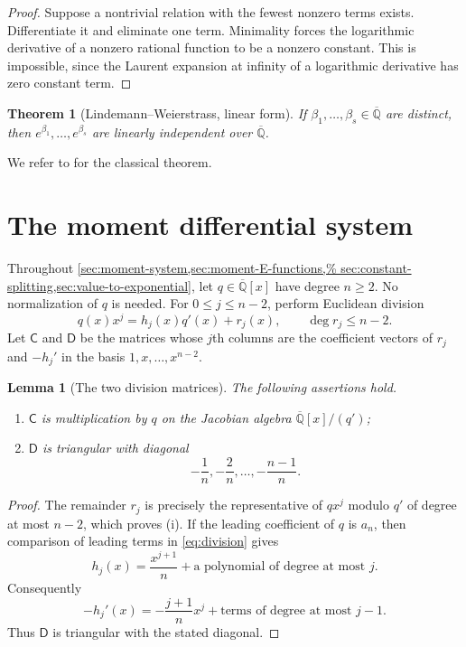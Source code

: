 \documentclass[11pt]{article}
\numberwithin{equation}{section}
\newtheorem{theorem}{Theorem}[section]
\newtheorem{lemma}[lemma]{Lemma}
\theoremstyle{definition}
\theoremstyle{remark}
\newcommand{\Qbar}{\overline{\mathbb Q}}
\begin{document}
\begin{proof}
Suppose a nontrivial relation with the fewest nonzero terms exists.
Differentiate it and eliminate one term.  Minimality forces the logarithmic
derivative of a nonzero rational function to be a nonzero constant.  This is
impossible, since the Laurent expansion at infinity of a logarithmic derivative
has zero constant term.
\end{proof}

\begin{theorem}[Lindemann--Weierstrass, linear form]
\label{thm:Lindemann-Weierstrass}
If $\beta_1,\ldots,\beta_s\in\Qbar$ are distinct, then
$e^{\beta_1},\ldots,e^{\beta_s}$ are linearly independent over $\Qbar$.
\end{theorem}

We refer to \cite[Chapter~1]{Baker} for the classical theorem.

\section{The moment differential system}\label{sec:moment-system}

Throughout \cref{sec:moment-system,sec:moment-E-functions,%
sec:constant-splitting,sec:value-to-exponential}, let
$q\in\Qbar[x]$ have degree $n\ge2$.  No normalization of $q$ is needed.
For $0\le j\le n-2$, perform Euclidean division
\begin{equation}\label{eq:division}
  q(x)x^j=h_j(x)q'(x)+r_j(x),
  \qquad \deg r_j\le n-2.
\end{equation}
Let $\mathsf C$ and $\mathsf D$ be the matrices whose $j$th columns are the
coefficient vectors of $r_j$ and $-h_j'$ in the basis
$1,x,\ldots,x^{n-2}$.

\begin{lemma}[The two division matrices]\label{lem:CD}
The following assertions hold.
\begin{enumerate}[label=\textup{(\roman*)},leftmargin=2.2em]
\item $\mathsf C$ is multiplication by $q$ on the Jacobian algebra
$\Qbar[x]/(q')$;
\item $\mathsf D$ is triangular with diagonal
\[
  -\frac1n,-\frac2n,\ldots,-\frac{n-1}{n}.
\]
\end{enumerate}
\end{lemma}

\begin{proof}
The remainder $r_j$ is precisely the representative of $qx^j$ modulo $q'$
of degree at most $n-2$, which proves (i).  If the leading coefficient of
$q$ is $a_n$, then comparison of leading terms in \eqref{eq:division} gives
\[
  h_j(x)=\frac{x^{j+1}}n+
  \text{a polynomial of degree at most }j.
\]
Consequently
\[
  -h_j'(x)=-\frac{j+1}{n}x^j+
  \text{terms of degree at most }j-1.
\]
Thus $\mathsf D$ is triangular with the stated diagonal.
\end{proof}
\end{document}
